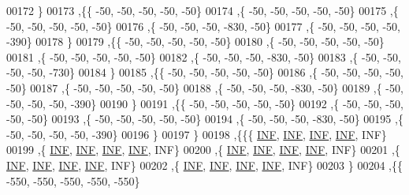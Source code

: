 \begin{DoxyCode}
00172   \}
00173  ,\{\{   -50,   -50,   -50,   -50,   -50\}
00174   ,\{   -50,   -50,   -50,   -50,   -50\}
00175   ,\{   -50,   -50,   -50,   -50,   -50\}
00176   ,\{   -50,   -50,   -50,  -830,   -50\}
00177   ,\{   -50,   -50,   -50,   -50,  -390\}
00178   \}
00179  ,\{\{   -50,   -50,   -50,   -50,   -50\}
00180   ,\{   -50,   -50,   -50,   -50,   -50\}
00181   ,\{   -50,   -50,   -50,   -50,   -50\}
00182   ,\{   -50,   -50,   -50,  -830,   -50\}
00183   ,\{   -50,   -50,   -50,   -50,  -730\}
00184   \}
00185  ,\{\{   -50,   -50,   -50,   -50,   -50\}
00186   ,\{   -50,   -50,   -50,   -50,   -50\}
00187   ,\{   -50,   -50,   -50,   -50,   -50\}
00188   ,\{   -50,   -50,   -50,  -830,   -50\}
00189   ,\{   -50,   -50,   -50,   -50,  -390\}
00190   \}
00191  ,\{\{   -50,   -50,   -50,   -50,   -50\}
00192   ,\{   -50,   -50,   -50,   -50,   -50\}
00193   ,\{   -50,   -50,   -50,   -50,   -50\}
00194   ,\{   -50,   -50,   -50,  -830,   -50\}
00195   ,\{   -50,   -50,   -50,   -50,  -390\}
00196   \}
00197  \}
00198 ,\{\{\{   \hyperlink{energy__const_8h_a12c2040f25d8e3a7b9e1c2024c618cb6}{INF},   \hyperlink{energy__const_8h_a12c2040f25d8e3a7b9e1c2024c618cb6}{INF},   \hyperlink{energy__const_8h_a12c2040f25d8e3a7b9e1c2024c618cb6}{INF},   \hyperlink{energy__const_8h_a12c2040f25d8e3a7b9e1c2024c618cb6}{INF},   INF\}
00199   ,\{   \hyperlink{energy__const_8h_a12c2040f25d8e3a7b9e1c2024c618cb6}{INF},   \hyperlink{energy__const_8h_a12c2040f25d8e3a7b9e1c2024c618cb6}{INF},   \hyperlink{energy__const_8h_a12c2040f25d8e3a7b9e1c2024c618cb6}{INF},   \hyperlink{energy__const_8h_a12c2040f25d8e3a7b9e1c2024c618cb6}{INF},   INF\}
00200   ,\{   \hyperlink{energy__const_8h_a12c2040f25d8e3a7b9e1c2024c618cb6}{INF},   \hyperlink{energy__const_8h_a12c2040f25d8e3a7b9e1c2024c618cb6}{INF},   \hyperlink{energy__const_8h_a12c2040f25d8e3a7b9e1c2024c618cb6}{INF},   \hyperlink{energy__const_8h_a12c2040f25d8e3a7b9e1c2024c618cb6}{INF},   INF\}
00201   ,\{   \hyperlink{energy__const_8h_a12c2040f25d8e3a7b9e1c2024c618cb6}{INF},   \hyperlink{energy__const_8h_a12c2040f25d8e3a7b9e1c2024c618cb6}{INF},   \hyperlink{energy__const_8h_a12c2040f25d8e3a7b9e1c2024c618cb6}{INF},   \hyperlink{energy__const_8h_a12c2040f25d8e3a7b9e1c2024c618cb6}{INF},   INF\}
00202   ,\{   \hyperlink{energy__const_8h_a12c2040f25d8e3a7b9e1c2024c618cb6}{INF},   \hyperlink{energy__const_8h_a12c2040f25d8e3a7b9e1c2024c618cb6}{INF},   \hyperlink{energy__const_8h_a12c2040f25d8e3a7b9e1c2024c618cb6}{INF},   \hyperlink{energy__const_8h_a12c2040f25d8e3a7b9e1c2024c618cb6}{INF},   INF\}
00203   \}
00204  ,\{\{  -550,  -550,  -550,  -550,  -550\}

\end{DoxyCode}
